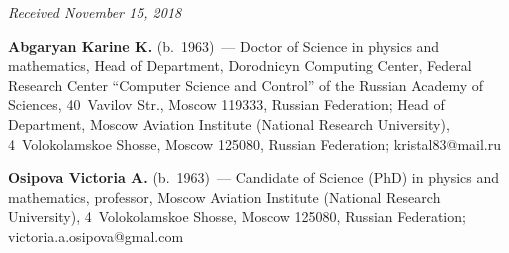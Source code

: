 \vspace*{-7pt}

\hfill{\small\textit{Received November 15, 2018}}


\vspace*{-22pt}

   
   \Contr
   
   \vspace*{-4pt}
   
   \noindent
   \textbf{Abgaryan Karine K.} (b.\ 1963)~--- Doctor of Science in physics and 
mathematics, Head of Department, Dorodnicyn Computing Center, Federal Research 
Center ``Computer Science and Control'' of the Russian Academy of Sciences, 
40~Vavilov Str., Moscow 119333, Russian Federation; Head of Department, Moscow 
Aviation Institute (National Research University), 4~Volokolamskoe Shosse, Moscow 
125080, Russian Federation; \mbox{kristal83@mail.ru}
   
   
   \noindent
   \textbf{Osipova Victoria A.} (b.\ 1963)~--- Candidate of Science (PhD) in physics 
and mathematics, professor, Moscow Aviation Institute (National Research University), 
4~Volokolamskoe Shosse, Moscow 125080, Russian Federation; 
\mbox{victoria.a.osipova@gmal.com} 
\label{end\stat}

\renewcommand{\bibname}{\protect\rm Литература}  